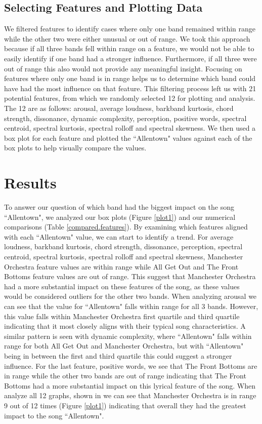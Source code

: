 \documentclass{article}\usepackage[]{graphicx}\usepackage[]{xcolor}
\begin{document}
\begin{multicols}{2}
\subsection{Selecting Features and Plotting Data}
We filtered features to identify cases where only one band remained within range while the other two were either unusual or out of range. We took this approach because if all three bands fell within range on a feature, we would not be able to easily identify if one band had a stronger influence. Furthermore, if all three were out of range this also would not provide any meaningful insight. Focusing on features where only one band is in range helps us to determine which band could have had the most influence on that feature. This filtering process left us with 21 potential features, from which we randomly selected 12 for plotting and analysis. The 12 are as follows: arousal, average loudness, barkband kurtosis, chord strength, dissonance, dynamic complexity, perception, positive words, spectral centroid, spectral kurtosis, spectral rolloff and spectral skewness. We then used a box plot for each feature and plotted the ``Allentown" values against each of the box plots to help visually compare the values. 

\section{Results}
To answer our question of which band had the biggest impact on the song ``Allentown", we analyzed our box plots (Figure \ref{plot1}) and our numerical comparisons (Table \ref{compared.features}). By examining which features aligned with each ``Allentown" value, we can start to identify a trend. For average loudness, barkband kurtosis, chord strength, dissonance, perception, spectral centroid, spectral kurtosis, spectral rolloff and spectral skewness, Manchester Orchestra feature values are within range while All Get Out and The Front Bottoms feature values are out of range. This suggest that Manchester Orchestra had a more substantial impact on these features of the song, as these values would be considered outliers for the other two bands. When analyzing arousal we can see that the value for ``Allentown" falls within range for all 3 bands. However, this value falls within Manchester Orchestra first quartile and third quartile indicating that it most closely aligns with their typical song characteristics. A similar pattern is seen with dynamic complexity, where ``Allentown" falls within range for both All Get Out and Manchester Orchestra, but with ``Allentown" being in between the first and third quartile this could suggest a stronger influence. For the last feature, positive words, we see that The Front Bottoms are in range while the other two bands are out of range indicating that The Front Bottoms had a more substantial impact on this lyrical feature of the song. When analyze all 12 graphs, shown in we can see that Manchester Orchestra is in range 9 out of 12 times (Figure \ref{plot1}) indicating that overall they had the greatest impact to the song ``Allentown".


\end{multicols}
\end{document}
